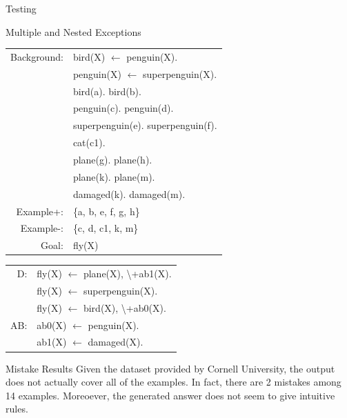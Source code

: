 \documentclass[12pt,a4paper]{article}
\begin{document}
\begin{section}{Testing}
		\begin{subsection}{Multiple and Nested Exceptions}
			\begin{multicols}{2}
			 \vspace{-1em}
				\begin{table}[H]
					\begin{tabular}{rl}
					Background: & bird(X) $\leftarrow$ penguin(X). \\
								& penguin(X) $\leftarrow$ superpenguin(X). \\
					            & bird(a). bird(b). \\
					            & penguin(c). penguin(d). \\
					            & superpenguin(e). superpenguin(f). \\
					            & cat(c1). \\
					            & plane(g). plane(h). \\
					            & plane(k). plane(m). \\
					            & damaged(k). damaged(m). \\
					Example+:   & \{a, b, e, f, g, h\} \\
					Example-:   & \{c, d, c1, k, m\} \\
					Goal:       & fly(X)                                      
					\end{tabular}
				\end{table}
				\columnbreak
				 \vspace{-1em}
				\begin{table}[H]
					\begin{tabular}{rl}
					D: & fly(X) $\leftarrow$ plane(X), \textbackslash{+ab1(X)}. \\
					   & fly(X) $\leftarrow$ superpenguin(X). \\
					   & fly(X) $\leftarrow$ bird(X), \textbackslash{+ab0(X)}. \\
					AB:& ab0(X) $\leftarrow$ penguin(X).\\
					   & ab1(X) $\leftarrow$ damaged(X).
					\end{tabular}
				\end{table}
			\end{multicols}
		\end{subsection}

		\begin{subsection}{Mistake Results}
			Given the dataset provided by Cornell University\cite{cornell}, the output does not actually cover all of the examples. In fact, there are 2 mistakes among 14 examples. Moreoever, the generated answer does not seem to give intuitive rules.


\end{subsection}
\end{section}
\end{document}
